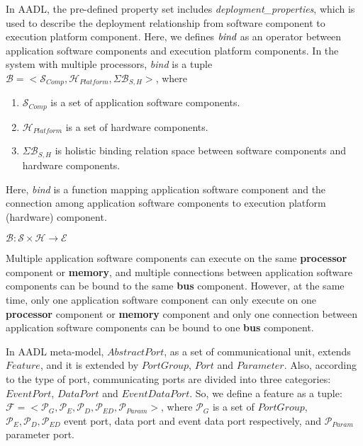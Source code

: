 In AADL, the pre-defined property set includes \emph{deployment\_properties}, which is used to describe the deployment relationship from software component to execution platform component. Here, we defines $\emph{bind}$ as an operator between application software components and execution platform components. In the system with multiple processors, \emph{bind} is a tuple $\mathcal{B} = <\mathcal{S}_{Comp}, \mathcal{H}_{Platform}, \Sigma\mathcal{B}_{S,H}>$, where
\begin{enumerate}
\item $\mathcal{S}_{Comp}$ is a set of application software components.
\item $\mathcal{H}_{Platform}$ is a set of hardware components.
\item $\Sigma\mathcal{B}_{S,H}$ is holistic binding relation space between software components and hardware components.
\end{enumerate}

Here, \emph{bind} is a function mapping application software component and the connection among application software components to execution platform (hardware) component. 
\begin{center}
$\mathcal{B}: \mathcal{S}\times\mathcal{H}\rightarrow \mathcal{E}$
\end{center}

Multiple application software components can execute on the same \textbf{processor} component or \textbf{memory}, and multiple connections between application software components can be bound to the same \textbf{bus} component. 
However, at the same time, only one application software component can only execute on one \textbf{processor} component or \textbf{memory} component and only one connection between application software components can be bound to one \textbf{bus} component. 

 In AADL meta-model, $AbstractPort$, as a set of communicational unit, extends $Feature$, and it is extended by $PortGroup$, $Port$ and $Parameter$. Also, according to the type of port, communicating ports are divided into three categories:  $EventPort$, $DataPort$ and $EventDataPort$. So, we define a feature as a tuple: $\mathcal{F} = <\mathcal{P}_{G}, \mathcal{P}_{E}, \mathcal{P}_{D}, \mathcal{P}_{ED}, \mathcal{P}_{Param}>$, where $\mathcal{P}_{G}$ is a set of $PortGroup$,  $\mathcal{P}_{E}, \mathcal{P}_{D}, \mathcal{P}_{ED}$ event port, data port and event data port respectively, and $\mathcal{P}_{Param}$ parameter port.




